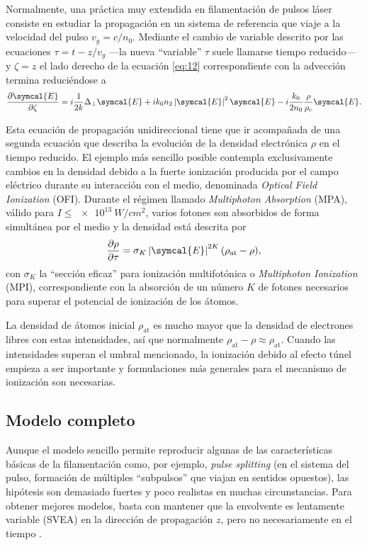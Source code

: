 \documentclass{scrartcl} %
\newcommand*{\pdv}[2]{\frac{\partial#1}{\partial#2}}
\newcommand*{\laplacian}{\Delta}
\newcommand*{\abs}[1]{\left|#1\right|}
\begin{document}
Normalmente, una práctica muy extendida en filamentación de pulsos láser \cite{Couairon2007, Couairon2011} consiste en estudiar la propagación en un sistema de referencia que viaje a la velocidad del pulso $v_{g} = c/n_{0}$. Mediante el cambio de variable descrito por las ecuaciones $\tau = t - z/v_{g}$ ---la nueva \enquote{variable} $\tau$ suele llamarse tiempo reducido--- y $\zeta = z$ el lado derecho de la ecuación \eqref{eq:12} correspondiente con la advección termina reduciéndose a
\begin{equation}\label{eq:13}
  \pdv{\symcal{E}}{\zeta} = i \frac{1}{2k} \laplacian_{\perp}\symcal{E} + i k_{0}n_{2}\abs{\symcal{E}}^{2}\symcal{E} - i \frac{k_{0}}{2n_{0}}\frac{\rho}{\rho_{c}} \symcal{E}.
\end{equation}

Esta ecuación de propagación unidireccional tiene que ir acompañada de una segunda ecuación que describa la evolución de la densidad electrónica $\rho$ en el tiempo reducido. El ejemplo más sencillo posible \cite{Couairon2007} contempla exclusivamente cambios en la densidad debido a la fuerte ionización producida por el campo eléctrico durante su interacción con el medio, denominada \emph{Optical Field Ionization} (OFI). Durante el régimen llamado \emph{Multiphoton Absorption} (MPA), válido para $I \leq \qty{e13}{W/cm^2}$, varios fotones son absorbidos de forma simultánea por el medio y la densidad está descrita por \cite{Couairon2006b, Couairon2009}
\begin{equation}\label{eq:14}
  \pdv{\rho}{\tau} = \sigma_{K}\abs{\symcal{E}}^{2K}(\rho_{\mathrm{at}} - \rho),
\end{equation}
con $\sigma_{K}$ la \enquote{sección eficaz} para ionización multifotónica o \emph{Multiphoton Ionization} (MPI), correspondiente con la absorción de un número $K$ de fotones necesarios para superar el potencial de ionización de los átomos. 

La densidad de átomos inicial $\rho_{\mathrm{at}}$ es mucho mayor que la densidad de electrones libres con estas intensidades, así que normalmente $\rho_{\mathrm{at}} - \rho \approx \rho_{\mathrm{at}}$. Cuando las intensidades superan el umbral mencionado, la ionización debido al efecto túnel empieza a ser importante y formulaciones más generales para el mecanismo de ionización \cite{Keldysh1965, Perelomov1966, Mishima2002} son necesarias.

\subsection{Modelo completo}\label{sec:12}
Aunque el modelo sencillo permite reproducir algunas de las características básicas de la filamentación como, por ejemplo, \emph{pulse splitting} (en el sistema del pulso, formación de múltiples \enquote{subpulsos} que viajan en sentidos opuestos), las hipótesis son demasiado fuertes y poco realistas en muchas circunstancias. Para obtener mejores modelos, basta con mantener que la envolvente es lentamente variable (SVEA) en la dirección de propagación $z$, pero no necesariamente en el tiempo \cite{Couairon2006b}.
\end{document}
